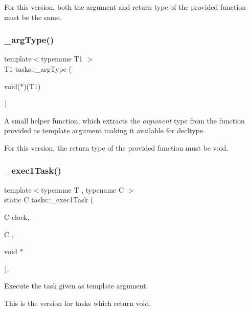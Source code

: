 For this version, both the argument and return type of the provided function must be the same. \hypertarget{namespacetasks_a7950bab5a2847e4ea072b489e93855cb}{}\label{namespacetasks_a7950bab5a2847e4ea072b489e93855cb} 
\subsubsection{\texorpdfstring{\+\_\+arg\+Type()}{\_argType()}\hspace{0.1cm}{\footnotesize\ttfamily [2/2]}}
{\footnotesize\ttfamily template$<$typename T1 $>$ \\
T1 tasks\+::\+\_\+arg\+Type (\begin{DoxyParamCaption}\item[{void($\ast$)(T1)}]{ }\end{DoxyParamCaption})}



A small helper function, which extracts the {\itshape argument} type from the function provided as template argument making it available for decltype. 

For this version, the return type of the provided function must be void. \hypertarget{namespacetasks_acc347173bd59f335faea1d7f1fcae0eb}{}\label{namespacetasks_acc347173bd59f335faea1d7f1fcae0eb} 
\subsubsection{\texorpdfstring{\+\_\+exec1\+Task()}{\_exec1Task()}\hspace{0.1cm}{\footnotesize\ttfamily [1/2]}}
{\footnotesize\ttfamily template$<$typename T , typename C $>$ \\
static C tasks\+::\+\_\+exec1\+Task (\begin{DoxyParamCaption}\item[{C}]{clock,  }\item[{C}]{,  }\item[{void $\ast$}]{ }\end{DoxyParamCaption})\hspace{0.3cm}{\ttfamily [inline]}, {\ttfamily [static]}}



Execute the task given as template argument. 

This is the version for tasks which return void.



